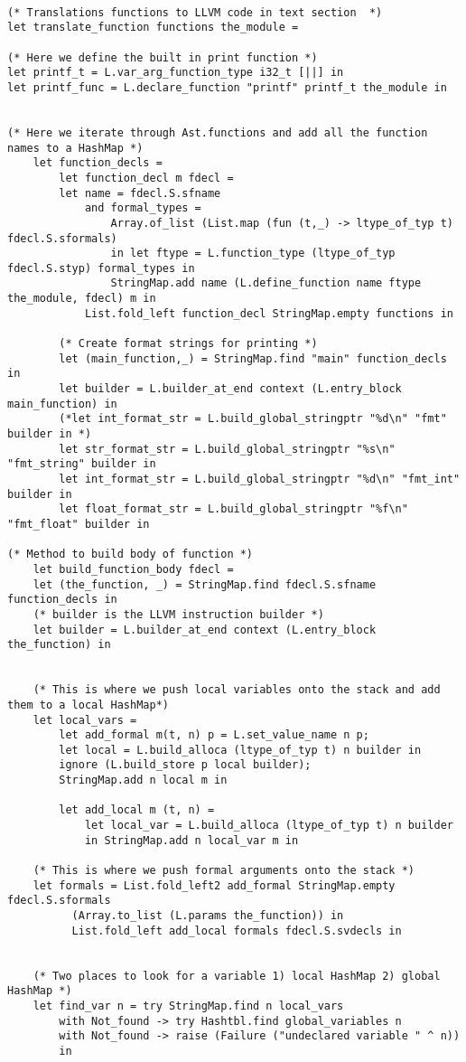 \documentclass{article}
\begin{document}
\begin{lstlisting}
	
(* Translations functions to LLVM code in text section  *)
let translate_function functions the_module = 

(* Here we define the built in print function *)
let printf_t = L.var_arg_function_type i32_t [||] in
let printf_func = L.declare_function "printf" printf_t the_module in


(* Here we iterate through Ast.functions and add all the function names to a HashMap *)
	let function_decls =
		let function_decl m fdecl =
		let name = fdecl.S.sfname
        	and formal_types =
            	Array.of_list (List.map (fun (t,_) -> ltype_of_typ t) fdecl.S.sformals)
            	in let ftype = L.function_type (ltype_of_typ fdecl.S.styp) formal_types in
             	StringMap.add name (L.define_function name ftype the_module, fdecl) m in
    		List.fold_left function_decl StringMap.empty functions in

		(* Create format strings for printing *)
		let (main_function,_) = StringMap.find "main" function_decls in
		let builder = L.builder_at_end context (L.entry_block main_function) in
		(*let int_format_str = L.build_global_stringptr "%d\n" "fmt" builder in *)
		let str_format_str = L.build_global_stringptr "%s\n" "fmt_string" builder in
		let int_format_str = L.build_global_stringptr "%d\n" "fmt_int" builder in
		let float_format_str = L.build_global_stringptr "%f\n" "fmt_float" builder in

(* Method to build body of function *)
	let build_function_body fdecl =
	let (the_function, _) = StringMap.find fdecl.S.sfname function_decls in
	(* builder is the LLVM instruction builder *)
	let builder = L.builder_at_end context (L.entry_block the_function) in

	
	(* This is where we push local variables onto the stack and add them to a local HashMap*)
	let local_vars = 
		let add_formal m(t, n) p = L.set_value_name n p;
		let local = L.build_alloca (ltype_of_typ t) n builder in
		ignore (L.build_store p local builder);
		StringMap.add n local m in

		let add_local m (t, n) =
        	let local_var = L.build_alloca (ltype_of_typ t) n builder
        	in StringMap.add n local_var m in

	(* This is where we push formal arguments onto the stack *)
	let formals = List.fold_left2 add_formal StringMap.empty fdecl.S.sformals
          (Array.to_list (L.params the_function)) in
          List.fold_left add_local formals fdecl.S.svdecls in


	(* Two places to look for a variable 1) local HashMap 2) global HashMap *)
	let find_var n = try StringMap.find n local_vars
		with Not_found -> try Hashtbl.find global_variables n
		with Not_found -> raise (Failure ("undeclared variable " ^ n))
		in


\end{lstlisting}
\end{document}
